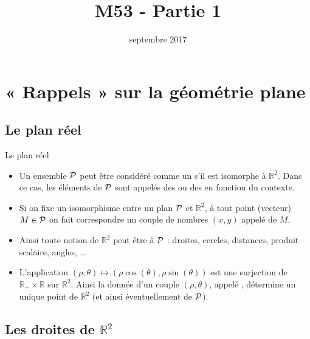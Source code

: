 \documentclass{m53beamer}
\title{M53 - Partie 1}
\date{septembre 2017}
\begin{document}
\begin{frame}
  \titlepage
\end{frame}
\section{« Rappels » sur la géométrie plane}

\subsection{Le plan réel}

\begin{frame}{Le plan réel}
  \begin{itemize}[<+(1)->]
    \item Un ensemble $\mathcal{P}$ peut être considéré comme un  s'il est  isomorphe à $\mathbb{R}^{2}$. \pause Dans ce cas, les éléments de $\mathcal{P}$ sont appelés des  ou des  en fonction du contexte.
    \item Si on fixe un isomorphisme entre un plan $\mathcal{P}$ et $\mathbb{R}^{2}$, à tout point (vecteur) $M \in \mathcal{P}$ on fait correspondre un couple de nombres $(x,y)$ appelé  de $M$.
    \item Ainsi toute notion de $\mathbb{R}^{2}$ peut être  à $\mathcal{P}$ : droites, cercles, distances, produit scalaire, angles, \ldots
    \item L'application $(\rho,\theta) \mapsto (\rho\cos(\theta),\rho\sin(\theta))$ est une surjection de $\mathbb{R}_{+}\times\mathbb{R}$ sur $\mathbb{R}^{2}$. \pause Ainsi la donnée d'un couple $(\rho,\theta)$, appelé , détermine un unique point de $\mathbb{R}^{2}$ (et ainsi éventuellement de $\mathcal{P}$).
  \end{itemize}
\end{frame}

\subsection{Les droites de \texorpdfstring{$\mathbb{R}^{2}$}{R²}}
\end{document}
